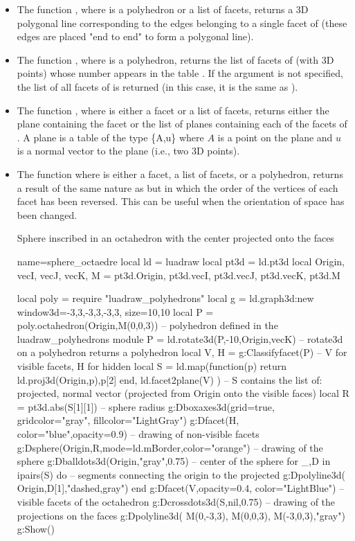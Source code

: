 \begin{itemize}
    \item The function , where  is a polyhedron or a list of facets, returns a 3D polygonal line corresponding to the edges belonging to a single facet of  (these edges are placed "end to end" to form a polygonal line).

    \item The function , where  is a polyhedron, returns the list of facets of  (with 3D points) whose number appears in the table . If the argument  is not specified, the list of all facets of  is returned (in this case, it is the same as ).

    \item The function , where  is either a facet or a list of facets, returns either the plane containing the facet or the list of planes containing each of the facets of . A plane is a table of the type \{A,u\} where $A$ is a point on the plane and $u$ is a normal vector to the plane (i.e., two 3D points).

    \item The function  where  is either a facet, a list of facets, or a polyhedron, returns a result of the same nature as  but in which the order of the vertices of each facet has been reversed. This can be useful when the orientation of space has been changed.

\begin{demo}{Sphere inscribed in an octahedron with the center projected onto the faces}
\begin{luadraw}{name=sphere_octaedre}
local ld = luadraw
local pt3d = ld.pt3d
local Origin, vecI, vecJ, vecK, M = pt3d.Origin, pt3d.vecI, pt3d.vecJ, pt3d.vecK, pt3d.M

local poly = require "luadraw_polyhedrons"
local g = ld.graph3d:new{ window3d={-3,3,-3,3,-3,3}, size={10,10}}
local P = poly.octahedron(Origin,M(0,0,3)) -- polyhedron defined in the luadraw_polyhedrons module
P = ld.rotate3d(P,-10,{Origin,vecK}) -- rotate3d on a polyhedron returns a polyhedron
local V, H = g:Classifyfacet(P) -- V for visible facets, H for hidden
local S = ld.map(function(p) return {ld.proj3d(Origin,p),p[2]} end, ld.facet2plane(V) )
-- S contains the list of: {projected, normal vector} (projected from Origin onto the visible faces)
local R = pt3d.abs(S[1][1]) -- sphere radius
g:Dboxaxes3d({grid=true, gridcolor="gray", fillcolor="LightGray"})
g:Dfacet(H, {color="blue",opacity=0.9}) -- drawing of non-visible facets
g:Dsphere(Origin,R,{mode=ld.mBorder,color="orange"}) -- drawing of the sphere
g:Dballdots3d(Origin,"gray",0.75) -- center of the sphere
for _,D in ipairs(S) do -- segments connecting the origin to the projected
    g:Dpolyline3d( {Origin,D[1]},"dashed,gray")
end
g:Dfacet(V,{opacity=0.4, color="LightBlue"}) -- visible facets of the octahedron
g:Dcrossdots3d(S,nil,0.75) -- drawing of the projections on the faces
g:Dpolyline3d( {M(0,-3,3), M(0,0,3), M(-3,0,3)},"gray")
g:Show()
\end{luadraw}
\end{demo}
\end{itemize}

